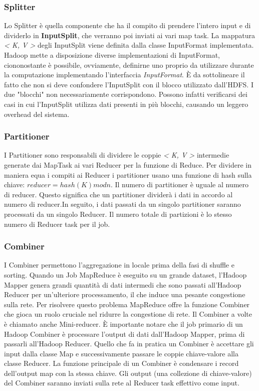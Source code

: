 \subsubsection{Splitter}
Lo Splitter è quella componente che ha il compito di prendere l’intero input e di dividerlo in \textbf{InputSplit}, che verranno poi inviati ai vari map task. La mappatura \textit{< K, V >} degli InputSplit viene definita dalla classe InputFormat implementata. Hadoop mette a disposizione diverse implementazioni di InputFormat, ciononostante è possibile, ovviamente, definirne uno proprio da utilizzare durante la computazione implementando l’interfaccia \textit{InputFormat}. È da sottolineare il fatto che non si deve confondere l’InputSplit con il blocco utilizzato dall’HDFS. I due "blocchi" non necessariamente corrispondono. Possono infatti verificarsi dei casi in cui l’InputSplit utilizza dati presenti in più blocchi, causando un leggero overhead del sistema.
\subsubsection{Partitioner}
I Partitioner sono responsabili di dividere le coppie \textit{< K, V >} intermedie generate dai MapTask ai vari Reducer per la funzione di Reduce. Per dividere in maniera equa i compiti ai Reducer i partitioner usano una funzione di hash sulla chiave: $reducer = hash(K) mod n$.
Il numero di partitioner è uguale al numero di reducer. Questo significa che un partitioner dividerà i dati in accordo al numero di reducer.In seguito, i dati passati da un singolo partitioner saranno processati da un singolo Reducer. Il numero totale di partizioni è lo stesso numero di Reducer task per il job.
\subsubsection{Combiner}
I Combiner permettono l'aggregazione in locale prima della fasi di shuffle e sorting. Quando un Job MapReduce è eseguito su un grande dataset, l'Hadoop Mapper genera grandi quantità di dati intermedi che sono passati all'Hadoop Reducer per un'ulteriore processamento, il che induce una pesante congestione sulla rete. Per risolvere questo problema MapReduce offre la funzione Combiner che gioca un ruolo cruciale nel ridurre la congestione di rete. Il Combiner a volte è chiamato anche Mini-reducer. È importante notare che il job primario di un Hadoop Combiner è processare l'output di dati dall'Hadoop Mapper, prima di passarli all'Hadoop Reducer. Quello che fa in pratica un Combiner è accettare gli input dalla classe Map e successivamente passare le coppie chiave-valore alla classe Reducer. La funzione principale di un Combiner è condensare i record dell'output map con la stessa chiave. Gli output (una collezione di chiave-valore) del Combiner saranno inviati sulla rete al Reducer task effettivo come input.
